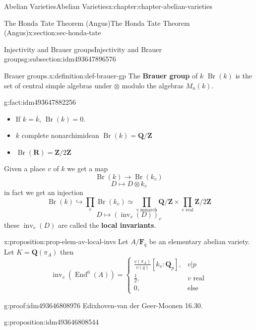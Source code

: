 \documentclass[oneside,10pt,]{book}
\newcommand{\terminology}[1]{\textbf{#1}}
\numberwithin{equation}{section}
\newcommand{\ZZ}{\mathbf{Z}}
\newcommand{\QQ}{\mathbf{Q}}
\newcommand{\RR}{\mathbf{R}}
\newcommand{\FF}{\mathbf{F}}
\DeclareMathOperator{\End}{End}
\newcommand{\amp}{&}
\begin{document}
\begin{chapterptx}{Abelian Varieties}{}{Abelian Varieties}{}{}{x:chapter:chapter-abelian-varieties}
\begin{sectionptx}{The Honda Tate Theorem (Angus)}{}{The Honda Tate Theorem (Angus)}{}{}{x:section:sec-honda-tate}
\begin{subsectionptx}{Injectivity and Brauer groups}{}{Injectivity and Brauer groups}{}{}{g:subsection:idm493647896576}
\begin{definition}{Brauer groups.}{x:definition:def-brauer-gp}
The \terminology{Brauer group} of \(k\) \(\operatorname{Br}(k)\) is the set of central simple algebras under \(\otimes\) modulo the algebras \(M_n(k)\).%
\end{definition}
\begin{fact}{}{}{g:fact:idm493647882256}%
%
\begin{itemize}[label=\textbullet]
\item{}If \(k = \overline k\), \(\operatorname{Br}(k) = 0\).%
\item{}\(k\) complete nonarchimidean \(\operatorname{Br}(k) = \QQ/\ZZ\)%
\item{}\(\displaystyle \operatorname{Br}(\RR) = \ZZ/2\ZZ\)%
\end{itemize}
Given a place \(v\) of \(k\) we get a map%
\begin{equation*}
\operatorname{Br}(k) \to \operatorname{Br}(k_v)
\end{equation*}
%
\begin{equation*}
D \mapsto D\otimes k_v
\end{equation*}
in fact we get an injection%
\begin{equation*}
\operatorname{Br}(k) \hookrightarrow \prod_v \operatorname{Br}(k_v) \simeq \prod_{v\text{ nonarch}} \QQ/\ZZ \times \prod_{v\text{ real}} \ZZ/2\ZZ
\end{equation*}
%
\begin{equation*}
D\mapsto (\operatorname{inv}_v(D))_v
\end{equation*}
these \(\operatorname{inv}_v(D)\) are called the \terminology{local invariants}.%
\end{fact}
\begin{proposition}{}{}{x:proposition:prop-elem-av-local-invs}%
Let \(A/\FF_q\) be an elementary abelian variety. Let \(K = \QQ(\pi_A)\) then%
\begin{equation*}
\operatorname{inv}_v(\End^0(A)) = \begin{cases} \frac{v(\pi_A)}{v(q)} [k_v: \QQ_p], \amp v|p\\ \frac 12,\amp v\text{ real}\\ 0, \amp \text{else}\end{cases}
\end{equation*}
%
\end{proposition}
\begin{proofptx}{}{g:proof:idm493646808976}
Edixhoven-van der Geer-Moonen 16.30.%
\end{proofptx}
\begin{proposition}{}{}{g:proposition:idm493646808544}%

\end{proposition}
\end{subsectionptx}
\end{sectionptx}
\end{chapterptx}
\end{document}
